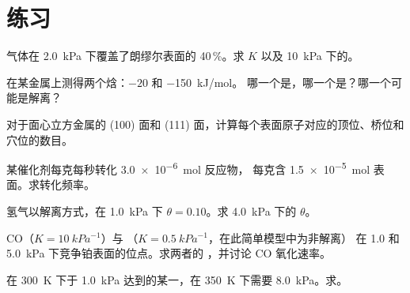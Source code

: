 \section{练习}

\begin{exercise}[$\star$]\label{exo:b3:surfaces-catalysis:1}
气体在 \qty{2.0}{kPa} 下覆盖了朗缪尔表面的 40\,\%。求 $K$ 以及
\qty{10}{kPa} 下的。
\end{exercise}

\begin{exercise}[$\star$]\label{exo:b3:surfaces-catalysis:2}
在某金属上测得两个焓：$-20$ 和 \qty{-150}{kJ/mol}。
哪一个是，哪一个是？哪一个可能是解离？
\end{exercise}

\begin{exercise}[$\star$]\label{exo:b3:surfaces-catalysis:3}
对于面心立方金属的 (100) 面和
(111) 面，计算每个表面原子对应的顶位、桥位和穴位的数目。
\end{exercise}

\begin{exercise}[$\star$]\label{exo:b3:surfaces-catalysis:4}
某催化剂每克每秒转化 \qty{3.0e-6}{mol} 反应物，
每克含 \qty{1.5e-5}{mol} 表面。求转化频率。
\end{exercise}

\begin{exercise}[$\star\star$]\label{exo:b3:surfaces-catalysis:5}
氢气以解离方式，在 \qty{1.0}{kPa} 下 $\theta = 0.10$。求 \qty{4.0}{kPa} 下的 $\theta$。
\end{exercise}

\begin{exercise}[$\star\star$]\label{exo:b3:surfaces-catalysis:6}
CO（$K = \qty{10}{kPa^{-1}}$）与 （$K = \qty{0.5}{kPa^{-1}}$，在此简单模型中为非解离）
在 1.0 和 \qty{5.0}{kPa} 下竞争铂表面的位点。求两者的
，并讨论 CO 氧化速率。
\end{exercise}

\begin{exercise}[$\star\star$]\label{exo:b3:surfaces-catalysis:7}
在 \qty{300}{K} 下于 \qty{1.0}{kPa} 达到的某一，在 \qty{350}{K} 下需要 \qty{8.0}{kPa}。求。
\end{exercise}

